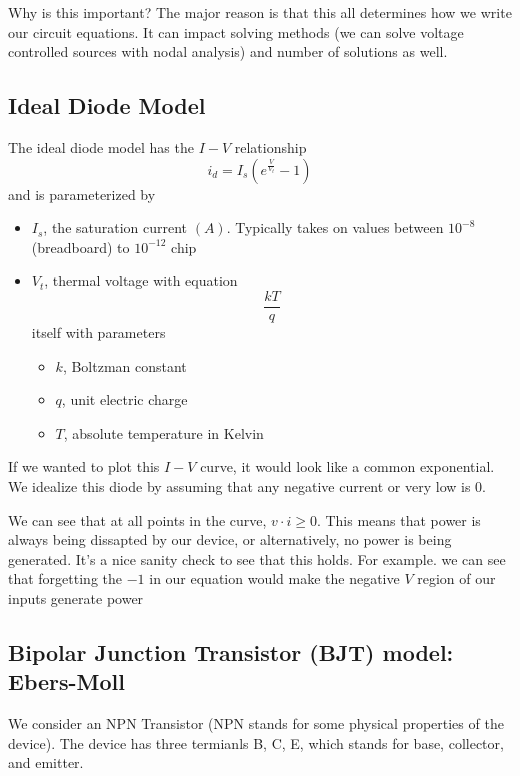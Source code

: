 \documentclass{report}
\begin{document}
Why is this important? The major reason is that this all determines how we write our circuit equations. It can impact solving methods (we can solve voltage controlled sources with nodal analysis) and number of solutions as well.

\subsection{Ideal Diode Model}
The ideal diode model has the $I-V$ relationship
\begin{equation*}
    i_d = I_s (e^{\frac{V}{V_t}} - 1)
\end{equation*}
and is parameterized by
\begin{itemize}
    \item $I_s$, the saturation current $(A)$. Typically takes on values between $10^{-8}$ (breadboard) to $10^{-12}$ chip
    \item $V_t$, thermal voltage with equation \begin{equation*}
        \frac{kT}{q}
    \end{equation*}
    itself with parameters \begin{itemize}
        \item $k$, Boltzman constant %
        \item $q$, unit electric charge %
        \item $T$, absolute temperature in Kelvin
    \end{itemize}
\end{itemize}
If we wanted to plot this $I-V$ curve, it would look like a common exponential. We idealize this diode by assuming that any negative current or very low is 0.

We can see that at all points in the curve, $v \cdot i \geq 0$. This means that power is always being dissapted by our device, or alternatively, no power is being generated. It's a nice sanity check to see that this holds. For example. we can see that forgetting the $-1$ in our equation would make the negative $V$ region of our inputs generate power

\subsection{Bipolar Junction Transistor (BJT) model: Ebers-Moll}
We consider an NPN Transistor (NPN stands for some physical properties of the device). The device has three termianls B, C, E, which stands for base, collector, and emitter.
\end{document}
